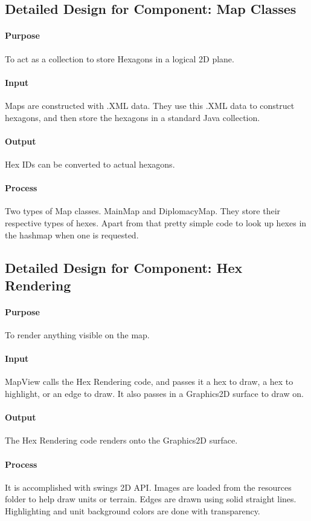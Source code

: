 \documentclass[12pt,a4paper,titlepage]{article}
\begin{document}
\subsection{Detailed Design for Component: Map Classes}
\paragraph{Purpose} To act as a collection to store Hexagons in a logical 2D plane.
\paragraph{Input}
Maps are constructed with .XML data. They use this .XML data to construct
hexagons, and then store the hexagons in a standard Java collection.
\paragraph{Output}
Hex IDs can be converted to actual hexagons.
\paragraph{Process}
Two types of Map classes. MainMap and DiplomacyMap. They store their respective
types of hexes. Apart from that pretty simple code to look up hexes in the hashmap
when one is requested.

\subsection{Detailed Design for Component: Hex Rendering}
\paragraph{Purpose} To render anything visible on the map.
\paragraph{Input}
MapView calls the Hex Rendering code, and passes it a hex to draw, a hex to highlight,
or an edge to draw. It also passes in a Graphics2D surface to draw on.
\paragraph{Output}
The Hex Rendering code renders onto the Graphics2D surface.
\paragraph{Process}
It is accomplished with swings 2D API. Images are
loaded from the resources folder to help draw units or terrain. 
Edges are drawn using solid straight lines.
Highlighting and unit background colors are done with transparency.
\end{document}
